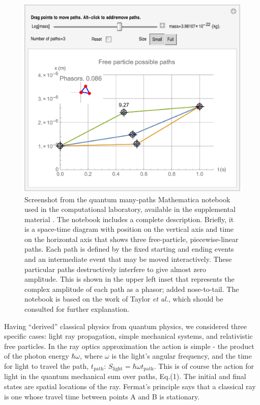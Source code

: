 \documentclass[prb,oncolumn,12pt]{revtex4-2}
\begin{document}
\begin{figure}[]
\includegraphics[width=14cm]{ActionCourseFigure.pdf}
\caption{Screenshot from the quantum many-paths Mathematica notebook used in the computational laboratory, available in the supplemental material \cite{supplement}.  The notebook includes a complete description. Briefly, it is a space-time diagram with position on the vertical axis and time on the horizontal axis that shows three free-particle, piecewise-linear paths. Each path is defined by the fixed starting and ending events and an intermediate event that may be moved interactively. These particular paths destructively interfere to give almost zero amplitude. This is shown in the upper left inset that represents the complex amplitude of each path as a phasor; added nose-to-tail. The notebook is based on the work of Taylor \textit{et al.}, \cite{TaylorCIP} which should be consulted for further explanation. }
\label{destructive interference}
\end{figure}

Having ``derived'' classical physics from quantum physics, we considered three specific cases: light ray propagation, simple mechanical systems, and relativistic free particles. In the ray optics approximation the action is simple - the product of the photon energy $\hbar \omega$, where $\omega$ is the light's angular frequency, and the time for light to travel the path, $t_\textrm{path}$: $S_\textrm{light} = \hbar \omega t_\textrm{path}$. This is of course the action for light in the quantum mechanical sum over paths, Eq.(1). The initial and final states are spatial locations of the ray. Fermat's principle says that a classical ray is one whose travel time between points A and B is stationary.
\end{document}
